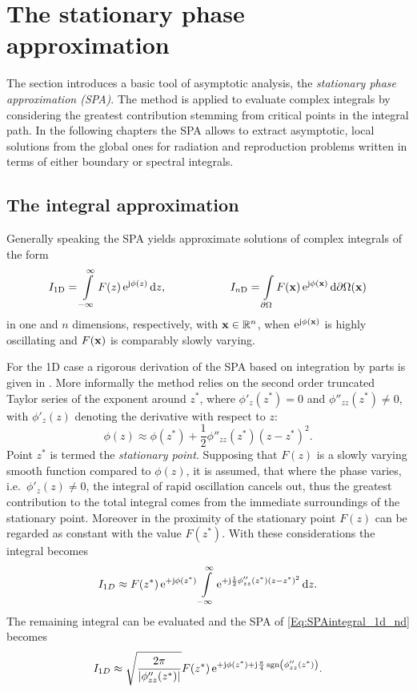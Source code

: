 \section{The stationary phase approximation}

The section introduces a basic tool of asymptotic analysis, the \emph{stationary phase approximation (SPA)}.
The method is applied to evaluate complex integrals by considering the greatest contribution stemming from critical points in the integral path.
In the following chapters the SPA allows to extract asymptotic, local solutions from the global ones for radiation and reproduction problems written in terms of either boundary or spectral integrals.

\subsection{The integral approximation}
%
Generally speaking the SPA yields approximate solutions of complex integrals of the form
\begin{equation}
\label{Eq:SPAintegral_1d_nd}
I_{1\mathrm{D}} = \int\limits_{-\infty}^{\infty} F(z) \, \te^{\ti \phi(z)} \, \td z,
\hspace{20mm} 
I_{n\mathrm{D}} = \int\limits_{\dO} F(\vx) \, \te^{\ti \phi(\vx)} \, \td \dO(\vx)
\end{equation}
in one and $n$ dimensions, respectively, with $\mathbf{x} \in \mathbb{R}^{n}$, when $\mathrm{e}^{\mathrm{j} \phi(\mathbf{x})}$ is highly oscillating and $F(\mathbf{x})$ is comparably slowly varying.

For the 1D case a rigorous derivation of the SPA based on integration by parts is given in \cite{Bleistein1984, Blenstein1975, Williams1999}.
More informally the method relies on the second order truncated Taylor series of the exponent around $z^*$, where $\phi'_z(z^*) = 0$ and $\phi''_{zz}(z^*) \neq 0$, with $\phi'_z(z)$ denoting the derivative with respect to $z$:
\begin{equation}
\phi(z) \approx \phi(z^*) + \frac{1}{2}\phi''_{zz}(z^*)(z-z^*)^2.
\end{equation}
Point $z^*$ is termed the \emph{stationary point}.
%
Supposing that $F(z)$ is a slowly varying smooth function compared to $\phi(z)$, it is assumed, that where the phase varies, i.e.\ $\phi'_z(z) \neq 0$, the integral of rapid oscillation cancels out, thus the greatest contribution to the total integral comes from the immediate surroundings of the stationary point.
Moreover in the proximity of the stationary point $F(z)$ can be regarded as constant with the value $F(z^*)$.
%
With these considerations the integral becomes
\begin{align}
I_{1D} \approx F(z^*)\,\mathrm{e}^{+\mathrm{j}\phi(z^*)} 
\int\limits_{-\infty}^{\infty} \mathrm{e}^{+\mathrm{j} \frac{1}{2}\phi''_{zz}(z^*)(z-z^*)^2} \, \mathrm{d} z.
\end{align}
The remaining integral can be evaluated and the SPA of \eqref{Eq:SPAintegral_1d_nd} becomes \cite[Ch.\ 2.8]{Blenstein1975}
\begin{equation}
\label{Eq:SPAResult}
I_{1D} \approx \sqrt{\frac{2\pi}{| \phi''_{zz}(z^*) |}} F(z^*) \, \mathrm{e}^{+\mathrm{j} \phi(z^*) + \mathrm{j} \frac{\pi}{4}\,\mathrm{sgn}\left(  \phi''_{zz}(z^*) \right)}.
\end{equation}

